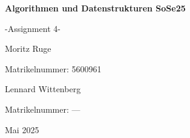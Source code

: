 \begin{titlepage}
    \centering
    \vspace*{3cm}
    {\Huge\bfseries Algorithmen und Datenstrukturen SoSe25 \par}
    \vspace{0.5cm}
    {\Huge -Assignment 4- \par}
    \vspace{1cm}
    {\Large Moritz Ruge \par}
    \vspace{0.1cm}
    {\small Matrikelnummer: 5600961 \par}
    {\Large Lennard Wittenberg \par}
    \vspace{0.1cm}
    {\small Matrikelnummer: ---\par}
    \vfill
    {\large Mai 2025}
\end{titlepage}